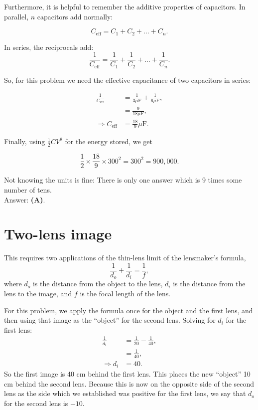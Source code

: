 \documentclass[11pt]{paper}
\newcommand{\answer}[1]{Answer: \textbf{(#1)}.}
\begin{document}
Furthermore, it is helpful to remember the additive properties of capacitors.  In parallel, $n$ capacitors add normally:

\begin{equation}
C_{\text{eff}} = C_1 + C_2 + \dots + C_n.
\end{equation}

In series, the reciprocals add:
\begin{equation}
\frac{1}{C_{\text{eff}}} =\frac{1}{C_1} + \frac{1}{C_2} + \dots + \frac{1}{C_n}.
\end{equation}

So, for this problem we need the effective capacitance of two capacitors in series:

\begin{align}
\frac{1}{C_\text{eff}} &= \frac{1}{3\mu\text{F}} + \frac{1}{6\mu\text{F}},\\
&= \frac{9}{18\mu\text{F}},\\
\Rightarrow C_\text{eff} &= \frac{18}{9}\mu\text{F}.
\end{align}

Finally, using $\frac{1}{2}CV^2$ for the energy stored, we get 

\begin{equation}
\frac{1}{2} \times \frac{18}{9} \times 300^2 = 300^2 = 900,000.
\end{equation}

Not knowing the units is fine: There is only one answer which is 9 times some number of tens.\\

\answer{A}

\section{Two-lens image}

This requires two applications of the thin-lens limit of the lensmaker's formula,
\begin{equation}
\frac{1}{d_o} + \frac{1}{d_i} = \frac{1}{f},
\end{equation}
where $d_o$ is the distance from the object to the lens, $d_i$ is the distance from the lens to the image, and $f$ is the focal length of the lens.

For this problem, we apply the formula once for the object and the first lens, and then using that image as the ``object'' for the second lens.  Solving for $d_i$ for the first lens:
\begin{align}
\frac{1}{d_i} &= \frac{1}{20} - \frac{1}{40},\\
&= \frac{1}{40},\\
\Rightarrow d_i &= 40.
\end{align}
So the first image is 40 cm behind the first lens.  This places the new ``object'' 10 cm behind the second lens.  Because this is now on the opposite side of the second lens as the side which we established was positive for the first lens, we say that $d_o$ for the second lens is $-10$.
\end{document}
